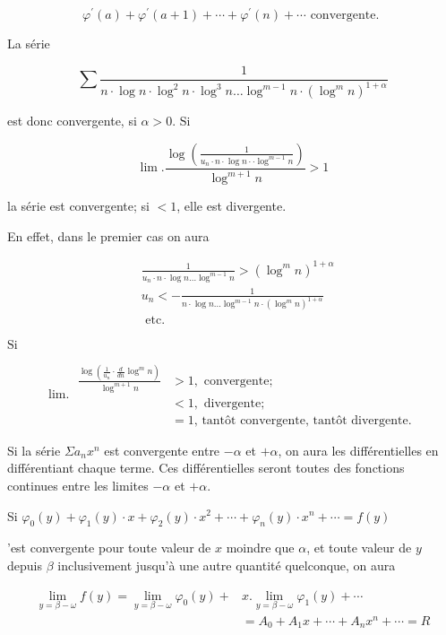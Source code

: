 \documentclass{article}
\begin{document}
\[
\varphi^{\prime}(a)+\varphi^{\prime}(a+1)+\cdots+\varphi^{\prime}(n)+\cdots \text { convergente. }
\]

La série

\[
\sum \frac{1}{n \cdot \log n \cdot \log ^{2} n \cdot \log ^{3} n \ldots \log ^{m-1} n \cdot\left(\log ^{m} n\right)^{1+\alpha}}
\]

est donc convergente, si \(\alpha>0\).
\(\mathrm{Si}\)

\[
\lim . \frac{\log \left(\frac{1}{u_{n} \cdot n \cdot \log n \cdot \cdot \log ^{m-1} n}\right)}{\log ^{m+1} n}>1
\]

la série est convergente; si \(<1\), elle est divergente.

En effet, dans le premier cas on aura

\[
\begin{aligned}
& \frac{1}{u_{n} \cdot n \cdot \log n \ldots \log ^{m-1} n}>\left(\log ^{m} n\right)^{1+\alpha} \\
& u_{n}<-\frac{1}{n \cdot \log n \ldots \log ^{m-1} n \cdot\left(\log ^{m} n\right)^{1+\alpha}} \\
& \text { etc. }
\end{aligned}
\]

\(\mathrm{Si}\)

\[
\operatorname{lim.} \begin{aligned}
\frac{\log \left(\frac{1}{u_{n}} \cdot \frac{d}{d n} \log ^{m} n\right)}{\log ^{m+1} n} & >1, \text { convergente; } \\
& <1, \text { divergente; } \\
& =1 \text {, tantôt convergente, tantôt divergente. }
\end{aligned}
\]

Si la série \(\Sigma a_{n} x^{n}\) est convergente entre \(-\alpha\) et \(+\alpha\), on aura les différentielles en différentiant chaque terme. Ces différentielles seront toutes des fonctions continues entre les limites \(-\alpha\) et \(+\alpha\).

Si \(\varphi_{0}(y)+\varphi_{1}(y) \cdot x+\varphi_{2}(y) \cdot x^{2}+\cdots+\varphi_{n}(y) \cdot x^{n}+\cdots=f(y)\)

'est convergente pour toute valeur de \(x\) moindre que \(\alpha\), et toute valeur de \(y\) depuis \(\beta\) inclusivement jusqu'à une autre quantité quelconque, on aura

\[
\begin{aligned}
\lim _{y=\beta-\omega} f(y)=\lim _{y=\beta-\omega} \varphi_{0}(y)+ & x . \lim _{y=\beta-\omega} \varphi_{1}(y)+\cdots \\
& =A_{0}+A_{1} x+\cdots+A_{n} x^{n}+\cdots=R
\end{aligned}
\]
\end{document}
